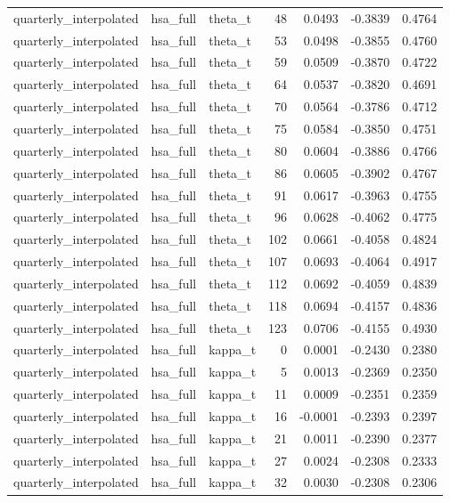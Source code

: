 \begin{tabular}{lllrrrr}
quarterly\_interpolated & hsa\_full & theta\_t & 48 & 0.0493 & -0.3839 & 0.4764 \\
quarterly\_interpolated & hsa\_full & theta\_t & 53 & 0.0498 & -0.3855 & 0.4760 \\
quarterly\_interpolated & hsa\_full & theta\_t & 59 & 0.0509 & -0.3870 & 0.4722 \\
quarterly\_interpolated & hsa\_full & theta\_t & 64 & 0.0537 & -0.3820 & 0.4691 \\
quarterly\_interpolated & hsa\_full & theta\_t & 70 & 0.0564 & -0.3786 & 0.4712 \\
quarterly\_interpolated & hsa\_full & theta\_t & 75 & 0.0584 & -0.3850 & 0.4751 \\
quarterly\_interpolated & hsa\_full & theta\_t & 80 & 0.0604 & -0.3886 & 0.4766 \\
quarterly\_interpolated & hsa\_full & theta\_t & 86 & 0.0605 & -0.3902 & 0.4767 \\
quarterly\_interpolated & hsa\_full & theta\_t & 91 & 0.0617 & -0.3963 & 0.4755 \\
quarterly\_interpolated & hsa\_full & theta\_t & 96 & 0.0628 & -0.4062 & 0.4775 \\
quarterly\_interpolated & hsa\_full & theta\_t & 102 & 0.0661 & -0.4058 & 0.4824 \\
quarterly\_interpolated & hsa\_full & theta\_t & 107 & 0.0693 & -0.4064 & 0.4917 \\
quarterly\_interpolated & hsa\_full & theta\_t & 112 & 0.0692 & -0.4059 & 0.4839 \\
quarterly\_interpolated & hsa\_full & theta\_t & 118 & 0.0694 & -0.4157 & 0.4836 \\
quarterly\_interpolated & hsa\_full & theta\_t & 123 & 0.0706 & -0.4155 & 0.4930 \\
quarterly\_interpolated & hsa\_full & kappa\_t & 0 & 0.0001 & -0.2430 & 0.2380 \\
quarterly\_interpolated & hsa\_full & kappa\_t & 5 & 0.0013 & -0.2369 & 0.2350 \\
quarterly\_interpolated & hsa\_full & kappa\_t & 11 & 0.0009 & -0.2351 & 0.2359 \\
quarterly\_interpolated & hsa\_full & kappa\_t & 16 & -0.0001 & -0.2393 & 0.2397 \\
quarterly\_interpolated & hsa\_full & kappa\_t & 21 & 0.0011 & -0.2390 & 0.2377 \\
quarterly\_interpolated & hsa\_full & kappa\_t & 27 & 0.0024 & -0.2308 & 0.2333 \\
quarterly\_interpolated & hsa\_full & kappa\_t & 32 & 0.0030 & -0.2308 & 0.2306 \\

\end{tabular}
